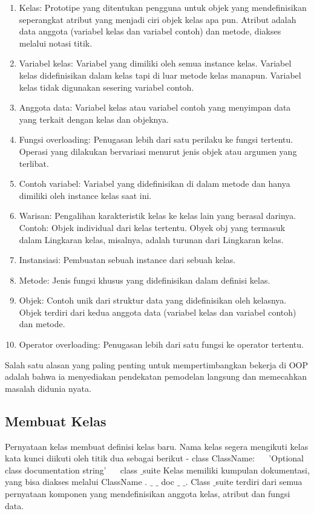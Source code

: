 \begin {enumerate}
\item Kelas: Prototipe yang ditentukan pengguna untuk objek yang mendefinisikan seperangkat atribut yang menjadi ciri objek kelas apa pun. Atribut adalah data anggota (variabel kelas dan variabel contoh) dan metode, diakses melalui notasi titik. 
\item Variabel kelas: Variabel yang dimiliki oleh semua instance kelas. Variabel kelas didefinisikan dalam kelas tapi di luar metode kelas manapun. Variabel kelas tidak digunakan sesering variabel contoh. 
\item Anggota data: Variabel kelas atau variabel contoh yang menyimpan data yang terkait dengan kelas dan objeknya. 
\item Fungsi overloading: Penugasan lebih dari satu perilaku ke fungsi tertentu. Operasi yang dilakukan bervariasi menurut jenis objek atau argumen yang terlibat.
\item Contoh variabel: Variabel yang didefinisikan di dalam metode dan hanya dimiliki oleh instance kelas saat ini.
\item Warisan: Pengalihan karakteristik kelas ke kelas lain yang berasal darinya. Contoh: Objek individual dari kelas tertentu. Obyek obj yang termasuk dalam Lingkaran kelas, misalnya, adalah turunan dari Lingkaran kelas. 
\item Instansiasi: Pembuatan sebuah instance dari sebuah kelas. 
\item Metode: Jenis fungsi khusus yang didefinisikan dalam definisi kelas.  
\item Objek: Contoh unik dari struktur data yang didefinisikan oleh kelasnya. Objek terdiri dari kedua anggota data (variabel kelas dan variabel contoh) dan metode.
\item Operator overloading: Penugasan lebih dari satu fungsi ke operator tertentu. 
\end{enumerate} 

Salah satu alasan yang paling penting untuk mempertimbangkan bekerja di OOP adalah bahwa ia menyediakan pendekatan pemodelan langsung dan memecahkan masalah didunia nyata. 

\vspace{12pt}
\subsection {Membuat Kelas}
\vspace{12pt}
Pernyataan kelas membuat definisi kelas baru. Nama kelas segera mengikuti kelas kata kunci diikuti oleh titik dua sebagai berikut - 
\vspace{12pt}
class ClassName: 
~~ 'Optional class documentation string'
~~ class $  \_  $suite 
\vspace{12pt}
Kelas memiliki kumpulan dokumentasi, yang bisa diakses melalui ClassName . $  \_  $ $  \_  $ doc $  \_  $ $  \_  $.  Class $  \_  $suite terdiri dari semua pernyataan komponen yang mendefinisikan anggota kelas, atribut dan fungsi data. 
\vspace{12pt}

